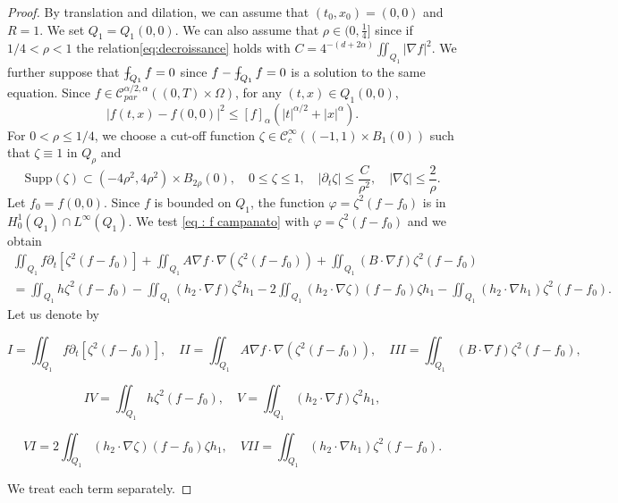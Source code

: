 \documentclass[reqno,12pt,twoside]{amsart}
\numberwithin{equation}{section} \numberwithin{theorem}{section}
\numberwithin{proposition}{section} \numberwithin{lemma}{section}
\numberwithin{corollary}{section}
\numberwithin{definition}{section} \numberwithin{remark}{section}
\newcommand{\C}{{\mathcal C}}
\def\Xint#1{\mathchoice
   {\XXint\displaystyle\textstyle{#1}}%
   {\XXint\textstyle\scriptstyle{#1}}%
   {\XXint\scriptstyle\scriptscriptstyle{#1}}%
   {\XXint\scriptscriptstyle\scriptscriptstyle{#1}}%
   \!\int}
\def\XXint#1#2#3{{\setbox0=\hbox{$#1{#2#3}{\int}$}
     \vcenter{\hbox{$#2#3$}}\kern-.5\wd0}}
\def\dashint{\Xint-}
\begin{document}
\begin{proof}
By translation and dilation, we can assume that \( (t_0,x_0)=(0,0)\) and $R=1$. We set $Q_1 = Q_1(0,0)$.  
We can also assume that \(\rho \in (0,\frac{1}{4}]\) since if \(1/4<\rho<1\) the relation\eqref{eq:decroissance} holds with \(C=4^{-(d+2\alpha)} \iint_{Q_1} |\nabla f|^2\). We further suppose that \(\dashint_{Q_1} f=0\) since \(f-\dashint_{Q_1} f=0\) is a solution to the same equation.
Since $f\in \mathcal{C}_{par}^{\alpha/2, \alpha}((0,T) \times \Omega)$, for any $(t,x) \in Q_1(0,0)$,  
\[|f(t,x)-f(0,0)|^2\leqslant [f]_{\alpha}(|t|^{\alpha /2} +|x|^{\alpha}).\]
For \(0<\rho \leqslant 1/4\), we choose a cut-off function $\zeta\in \C^\infty_c((-1,1)\times B_1(0))$ such that \(\zeta \equiv 1\) in \(Q_\rho\) and 
\begin{equation}\label{eq:prop_zeta}
\text{Supp}(\zeta) \subset (-4\rho^2, 4\rho^2)\times B_{2\rho}(0), \quad 
0\leqslant \zeta\leqslant 1, \quad |\partial_t\zeta|\leqslant \frac{C}{\rho^2}, \quad |\nabla \zeta| \leqslant \frac{2}{\rho}.
\end{equation}
Let $f_0 = f(0,0)$. Since $f$ is bounded on $Q_1$, the function \(\varphi=\zeta^2(f-f_0)\) is in $H_0^1(Q_1) \cap L^\infty(Q_1)$. We test \eqref{eq : f campanato} with \(\varphi=\zeta^2(f-f_0)\) 
and we obtain
\begin{multline}\label{Caccio star}
\iint_{Q_1}  f \partial_t[\zeta^2(f-f_0)]+\iint_{Q_1} A \nabla f\cdot \nabla (\zeta^2(f-f_0))+\iint_{Q_1} (B\cdot \nabla f) \zeta^2(f-f_0)\\
 = \iint_{Q_1} h \zeta^2 (f -f_0) - \iint_{Q_1} (h_2\cdot \nabla f) \zeta^2 h_1 - 2\iint_{Q_1} (h_2\cdot \nabla \zeta) (f-f_0) \zeta h_1 - \iint_{Q_1} (h_2 \cdot \nabla h_1) \zeta^2 (f-f_0).
\end{multline}
Let us denote by 

\[I = \iint_{Q_1}  f \partial_t[\zeta^2(f-f_0)], \quad II = \iint_{Q_1} A \nabla f\cdot \nabla (\zeta^2(f-f_0)),  \quad III = \iint_{Q_1} (B \cdot \nabla f) \zeta^2(f-f_0),\]

\[IV = \iint_{Q_1} h \zeta^2 (f -f_0), \quad V = \iint_{Q_1} (h_2\cdot \nabla f) \zeta^2 h_1, \]

\[VI =  2\iint_{Q_1} (h_2\cdot \nabla \zeta) (f-f_0) \zeta h_1, \quad VII =\iint_{Q_1} (h_2 \cdot \nabla h_1) \zeta^2 (f-f_0).\] 

We treat each term separately. 


\end{proof}
\end{document}
